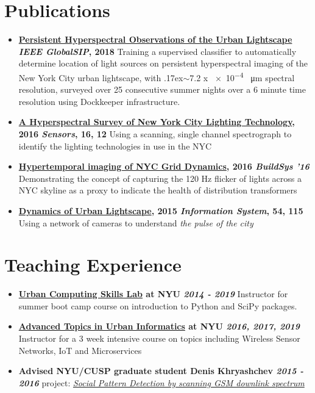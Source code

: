 \documentclass[letterpaper,10.5pt]{article}
\newcommand{\resumePubItem}[3]{
	\item\small{
		\textbf{#1 \null\hfill{#2}}{#3} \vspace{-2pt}
	}
}
\newcommand{\resumePublicationItem}[3]{\resumePubItem{#1}{#2}\newline{#3}\vspace{-4pt}}
\newcommand{\resumeSubHeadingListStart}{\begin{itemize}[leftmargin=*]}
\newcommand{\resumeSubHeadingListEnd}{\end{itemize}}
\newcommand{\resumeTilde}{\raise.17ex\hbox{$\scriptstyle\sim$}}
\begin{document}
\section{\color[HTML]{DF691A} Publications}
  \resumeSubHeadingListStart
  	\resumePublicationItem{\href{https://ieeexplore.ieee.org/document/8646419}{Persistent Hyperspectral Observations of the Urban Lightscape}}{\textit{IEEE GlobalSIP}, 2018}{Training a supervised classifier to automatically determine location of light sources on persistent hyperspectral imaging of the New York City urban lightscape, with \resumeTilde 7.2 x \num{e-4} \SI{}{\micro\metre} spectral resolution, surveyed over 25 consecutive summer nights over a 6 minute time resolution using Dockkeeper infrastructure.}
    \resumePublicationItem{\href{http://www.mdpi.com/1424-8220/16/12/2047/html}{A Hyperspectral Survey of New York City Lighting Technology}, 2016}{\textit{Sensors}, 16, 12} 
    {Using a scanning, single channel spectrograph to identify the lighting technologies in use in the NYC}
    \resumePublicationItem{\href{http://dl.acm.org/citation.cfm?id=2993570}{Hypertemporal imaging of NYC Grid Dynamics}, 2016}{\textit{BuildSys '16}}  
    {Demonstrating the concept of capturing the 120 Hz flicker of lights across a NYC skyline as a proxy to indicate the health of distribution transformers}
    \resumePublicationItem{\href{http://www.sciencedirect.com/science/article/pii/S0306437915001167}{Dynamics of Urban Lightscape},  2015}{\textit{Information System}, 54, 115}    
    {Using a network of cameras to understand \textit{the pulse of the city}}
  \resumeSubHeadingListEnd

\section{\color[HTML]{DF691A} Teaching Experience}
  \resumeSubHeadingListStart
    \resumePublicationItem{ \href{https://sharmamohit.com/\#teaching}{\textbf{Urban Computing Skills Lab}} at NYU}{\textit{2014 - 2019}}
    {Instructor for summer boot camp course on introduction to Python and SciPy packages.}
    \resumePublicationItem{ \href{https://sharmamohit.com/\#teaching}{\textbf{Advanced Topics in Urban Informatics}} at NYU}{\textit{2016, 2017, 2019}}
    {Instructor for a 3 week intensive course on topics including Wireless Sensor Networks, IoT and Microservices}
    \resumePublicationItem{Advised NYU/CUSP graduate student Denis Khryashchev}{\textit{2015 - 2016}}{project: \href{https://www.overleaf.com/read/ssrzkqkznpkw}{\textit{Social Pattern Detection by scanning GSM downlink spectrum}}}
  \resumeSubHeadingListEnd
\end{document}

